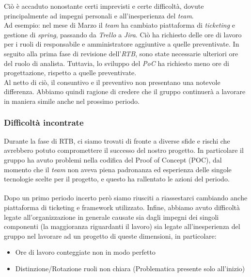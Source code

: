 \documentclass[5pt]{article}
\begin{document}
    Ciò è accaduto nonostante certi imprevisti e certe difficoltà, dovute principalmente ad impegni personali e all'inesperienza del \textit{team}. \\
    Ad esempio: nel mese di Marzo il \textit{team} ha cambiato piattaforma di \textit{ticketing} e gestione di \textit{spring}, passando da \textit{Trello} a \textit{Jira}.
    Ciò ha richiesto delle ore di lavoro per i ruoli di responsabile e amministratore aggiuntive a quelle preventivate.
    In seguito alla prima fase di revisione dell'\textit{RTB}, sono state necessarie ulteriori ore del ruolo di analista.
    Tuttavia, lo sviluppo del \textit{PoC} ha richiesto meno ore di progettazione, rispetto a quelle preventivate.\\
    Al netto di ciò, il consuntivo e il preventivo non presentano una notevole differenza. Abbiamo quindi ragione di credere che il gruppo continuerà 
    a lavorare in maniera simile anche nel prossimo periodo.

    \subsubsection{Difficoltà incontrate}
Durante la fase di RTB, ci siamo trovati di fronte a diverse sfide e rischi che avrebbero potuto compromettere il successo del nostro progetto. 
In particolare il gruppo ha avuto problemi nella codifica del Proof of Concept (POC), dal momento che il \textit{team} non aveva piena padronanza ed esperienza delle singole tecnologie scelte per il progetto, e questo ha rallentato le azioni del periodo.\\\\
Dopo un primo periodo incerto però siamo riusciti a riassestarci cambiando anche piattaforma di ticketing e framework utilizzato. 
Infine, abbiamo avuto difficoltà legate all'organizzazione in generale causate sia dagli impegni dei singoli componenti (la maggioranza riguardanti il lavoro) sia legate all'inesperienza del gruppo nel lavorare ad un progetto di queste dimensioni, in particolare:
\begin{itemize}
    \item Ore di lavoro conteggiate non in modo perfetto
    \item Distinzione/Rotazione ruoli non chiara (Problematica presente solo all'inizio)
\end{itemize}
    
\end{document}
